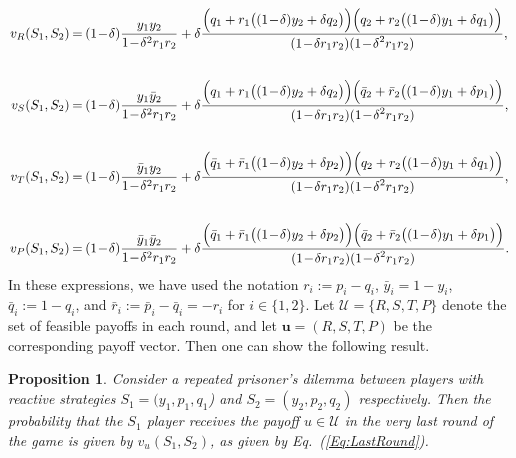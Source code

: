 \documentclass[11pt]{article}
\theoremstyle{plainCl1}
\newtheorem{Prop}{Proposition}
\theoremstyle{plainCl2}
\begin{document}
\begin{equation} \label{Eq:LastRound}
\setlength{\arraycolsep}{1pt}
\begin{array}{rcl}

v_{R}(S_1,S_2)	&=	&\displaystyle (1\!-\!\delta)\frac{y_1y_2}{1\!-\!\delta^2 r_1 r_2}+\delta \frac{\Big(q_1+r_1\big((1\!-\!\delta)y_2+\delta q_2\big)\Big) \Big(q_2+r_2\big((1\!-\!\delta)y_1+\delta q_1\big)\Big)}
{\displaystyle(1\!-\!\delta r_1r_2)(1\!-\!\delta^2 r_1 r_2)},\\[1cm]

v_{S}(S_1,S_2)	&=	&\displaystyle (1\!-\!\delta)\frac{y_1\bar{y}_2}{1\!-\!\delta^2 r_1 r_2}+\delta \frac{\Big(q_1+r_1\big((1\!-\!\delta)y_2+\delta q_2\big)\Big) \Big(\bar{q}_2+\bar{r}_2\big((1\!-\!\delta)y_1+\delta p_1\big)\Big)}
{\displaystyle(1\!-\!\delta r_1r_2)(1\!-\!\delta^2 r_1 r_2)},\\[1cm]

v_{T}(S_1,S_2)	&=	&\displaystyle (1\!-\!\delta)\frac{\bar{y}_1y_2}{1\!-\!\delta^2 r_1 r_2}+\delta \frac{\Big(\bar{q}_1+\bar{r}_1\big((1\!-\!\delta)y_2+\delta p_2\big)\Big) \Big(q_2+r_2\big((1\!-\!\delta)y_1+\delta q_1\big)\Big)}
{\displaystyle(1\!-\!\delta r_1r_2)(1\!-\!\delta^2 r_1 r_2)},\\[1cm]

v_{P}(S_1,S_2)	&=	&\displaystyle (1\!-\!\delta)\frac{\bar{y}_1\bar{y}_2}{1\!-\!\delta^2 r_1 r_2}+\delta \frac{\Big(\bar{q}_1+\bar{r}_1\big((1\!-\!\delta)y_2+\delta p_2\big)\Big) \Big(\bar{q}_2+\bar{r}_2\big((1\!-\!\delta)y_1+\delta p_1\big)\Big)}
{\displaystyle(1\!-\!\delta r_1r_2)(1\!-\!\delta^2 r_1 r_2)}.

\end{array}
\end{equation}
In these expressions, we have used the notation $r_i:=p_i\!-\!q_i$, $\bar{y}_i\!=\!1\!-\!y_i$, $\bar{q}_i:=1\!-\!q_i$, and $\bar{r}_i:=\bar{p}_i\!-\!\bar{q}_i=-r_i$ for $i\!\in\!\{1,2\}$. Let $\mathcal{U}=\{R,S,T,P\}$ denote the set of feasible payoffs in each round, and let $\mathbf{u}\!=\!(R,S,T,P)$ be the corresponding payoff vector. Then one can show the following result.

\begin{Prop}
Consider a repeated prisoner's dilemma between players with reactive strategies $S_1\!=\!(y_1, p_1, q_1$)  and $S_2\!=\!(y_2,p_2,q_2)$ respectively. Then the probability that the $S_1$ player receives the payoff $u\!\in\! \mathcal{U}$ in the very last round of the game is given by $v_{u}(S_1,S_2)$, as given by Eq.~(\ref{Eq:LastRound}). 
\end{Prop}
\end{document}
